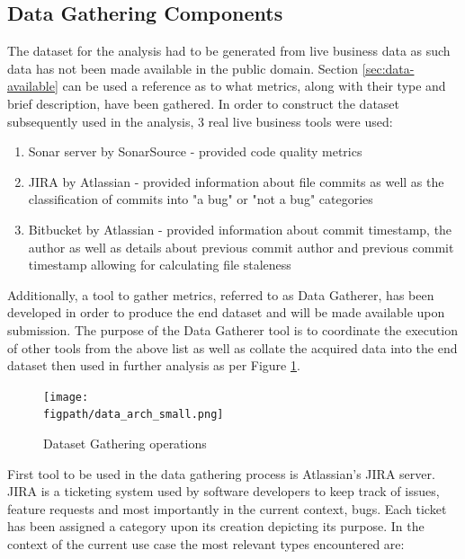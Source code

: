\subsection{Data Gathering Components}
The dataset for the analysis had to be generated from live business data as such data has not been made available in the public domain. Section \ref{sec:data-available} can be used a reference as to what metrics, along with their type and brief description, have been gathered. In order to construct the dataset subsequently used in the analysis, 3 real live business tools were used:

\begin{enumerate}{\label{lst:tools_used}}
    \item Sonar server by SonarSource - provided code quality metrics
    \item JIRA by Atlassian  - provided information about file commits as well as the classification of commits into "a bug" or "not a bug" categories
    \item Bitbucket by Atlassian  - provided information about commit timestamp, the author as well as details about previous commit author and previous commit timestamp allowing for calculating file staleness 
\end{enumerate}
    
Additionally, a tool to gather metrics, referred to as Data Gatherer, has been developed in order to produce the end dataset and will be made available upon submission. The purpose of the Data Gatherer tool is to coordinate the execution of other tools from the above list as well as collate the acquired data into the end dataset then used in further analysis as per Figure \ref{fig:data_gathering}.

\begin{figure}[h!]
\centering
    \texttt{[image: \\figpath/data\_arch\_small.png]}
    \caption{Dataset Gathering operations}
    \label{fig:data_gathering}
\end{figure}

First tool to be used in the data gathering process is Atlassian's JIRA server. JIRA is a ticketing system used by software developers to keep track of issues, feature requests and most importantly in the current context, bugs. Each ticket has been assigned a category upon its creation depicting its purpose. In the context of the current use case the most relevant types encountered are:

